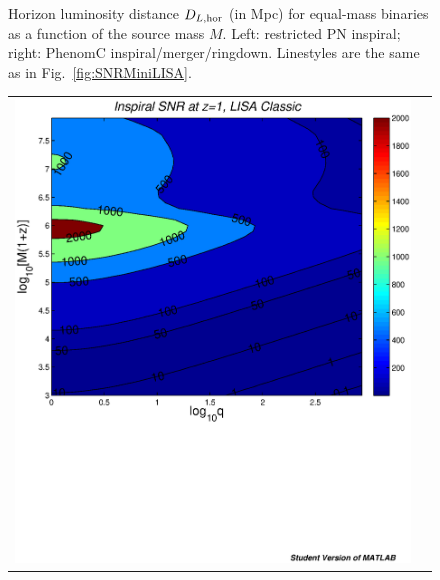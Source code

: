 \documentclass{iopart}
\begin{document}
\begin{figure}[H]
\begin{center}
\begin{tabular}{cc}
\end{tabular}
\caption{\label{fig:DLMiniLISA} Horizon luminosity distance $D_{L, {\rm hor}}$
  (in Mpc) for equal-mass binaries as a function of the source mass $M$. Left:
  restricted PN inspiral; right: {\sc PhenomC}
  inspiral/merger/ringdown. Linestyles are the same as in
  Fig.~\ref{fig:SNRMiniLISA}.}
\end{center}
\end{figure}
%

%
\begin{figure}[H]
\begin{center}
\begin{tabular}{cc}
\includegraphics[scale=0.41,clip=true]{FigEmanuele/InspSNRContourz1.ps}

\end{tabular}
\end{center}
\end{figure}
\end{document}
